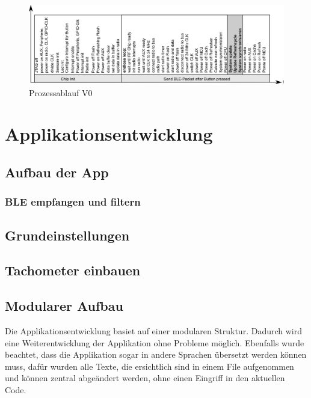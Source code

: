 \begin{figure}
  \includegraphics[width=1.0\textwidth]{../ressources/SimpleLink/V0Sendeablauf.png}
  \caption{Prozessablauf V0}
\end{figure}




\section{Applikationsentwicklung}

\subsection{Aufbau der App}

\subsubsection{BLE empfangen und filtern}

\subsection{Grundeinstellungen}

\subsection{Tachometer einbauen}

\subsection{Modularer Aufbau}

Die Applikationsentwicklung basiet auf einer modularen Struktur.  Dadurch wird eine Weiterentwicklung der Applikation ohne Probleme möglich. Ebenfalls wurde beachtet, dass die Applikation sogar in andere Sprachen übersetzt werden können muss, dafür wurden alle Texte, die ersichtlich sind in einem File aufgenommen und können zentral abgeändert werden, ohne einen Eingriff in den aktuellen Code.


